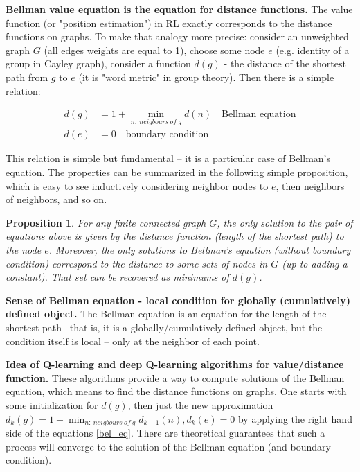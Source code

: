 \documentclass[atmp]{ipart_v1}
\numberwithin{equation}{section}
\theoremstyle{plain}%
\newtheorem{proposition}[theorem]{Proposition}
\begin{document}
{\bf Bellman value equation is the equation for distance functions.}
The value function (or "position estimation") in RL exactly corresponds to the distance functions on graphs. 
To make that analogy more precise: consider an unweighted graph $G$ (all edges weights are equal to 1), choose some node $e$ (e.g. identity of a group in Cayley graph), consider a function $d(g)$ - the distance of the shortest path from $g$ to $e$ (it is "\href{https://en.wikipedia.org/wiki/Word_metric}{word metric}" in group theory). Then there is a simple relation:

\begin{align} 
\label{bel_eq}
d(g) & = 1 + \min_{n:~neigbours~of~g} d(n)  \text{~~~Bellman equation}\\
d(e) & = 0 \text{~~~boundary condition}
\end{align} 

This relation is simple but fundamental -- it is a particular case of Bellman's equation. The properties can be summarized in the following simple proposition, which is easy to see inductively considering neighbor nodes to $e$, then neighbors of neighbors, and so on.

\begin{proposition}
  For any finite connected graph $G$, the only solution to the pair of equations above is given by the distance function (length of the shortest path) to the node $e$. Moreover, the only solutions to Bellman's equation (without boundary condition) correspond to the distance to some sets of nodes in $G$ (up to adding a constant). That set can be recovered as minimums of $d(g)$. 
\end{proposition}

{\bf Sense of Bellman equation - local condition for globally (cumulatively) defined object.}
The Bellman equation is an equation for the length of the shortest path --that is, it is a globally/cumulatively defined object, but the condition itself is local -- only at the neighbor of each point.  

{\bf Idea of Q-learning and deep Q-learning algorithms for value/distance function.}
These algorithms provide a way to compute solutions of the Bellman equation, which means to find the distance functions on graphs. One starts with some  initialization for $d(g)$, then just  the new approximation $d_k(g) = 1+\min_{n:~neigbours~of~g} d_{k-1}(n), d_{k}(e) =0$ by applying the right hand side of the equations \ref{bel_eq}. There are theoretical guarantees that such a process will converge to the solution of the Bellman equation (and boundary condition). 
\end{document}
